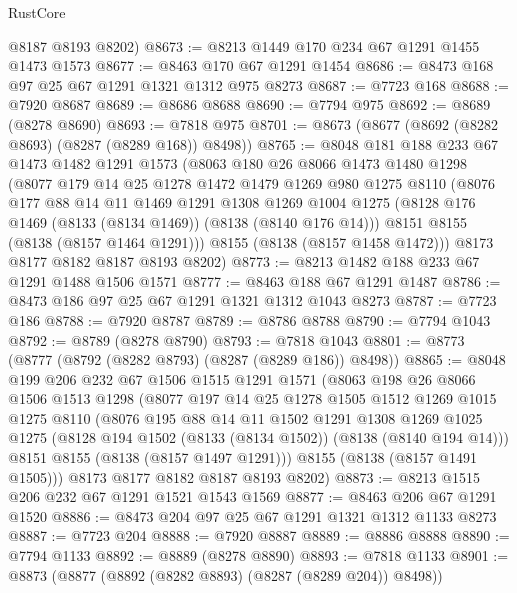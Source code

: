 \begin{lexlean}{RustCore}
\begin{coremodule}
      @8187
      @8193
      @8202)
@8673 := @8213 @1449 @170 @234 @67 @1291 @1455 @1473 @1573
@8677 := @8463 @170 @67 @1291 @1454
@8686 := @8473 @168 @97 @25 @67 @1291 @1321 @1312 @975 @8273
@8687 := @7723 @168
@8688 := @7920 @8687
@8689 := @8686 @8688
@8690 := @7794 @975
@8692 := @8689 (@8278 @8690)
@8693 := @7818 @975
@8701 := @8673 (@8677 (@8692 (@8282 @8693) (@8287 (@8289 @168)) @8498))
@8765 := @8048
    @181
    @188
    @233
    @67
    @1473
    @1482
    @1291
    @1573
    (@8063
      @180
      @26
      @8066
      @1473
      @1480
      @1298
      (@8077
        @179
        @14
        @25
        @1278
        @1472
        @1479
        @1269
        @980
        @1275
        @8110
        (@8076
          @177
          @88
          @14
          @11
          @1469
          @1291
          @1308
          @1269
          @1004
          @1275
          (@8128 @176 @1469 (@8133 (@8134 @1469)) (@8138 (@8140 @176 @14)))
          @8151
          @8155
          (@8138 (@8157 @1464 @1291)))
        @8155
        (@8138 (@8157 @1458 @1472)))
      @8173
      @8177
      @8182
      @8187
      @8193
      @8202)
@8773 := @8213 @1482 @188 @233 @67 @1291 @1488 @1506 @1571
@8777 := @8463 @188 @67 @1291 @1487
@8786 := @8473 @186 @97 @25 @67 @1291 @1321 @1312 @1043 @8273
@8787 := @7723 @186
@8788 := @7920 @8787
@8789 := @8786 @8788
@8790 := @7794 @1043
@8792 := @8789 (@8278 @8790)
@8793 := @7818 @1043
@8801 := @8773 (@8777 (@8792 (@8282 @8793) (@8287 (@8289 @186)) @8498))
@8865 := @8048
    @199
    @206
    @232
    @67
    @1506
    @1515
    @1291
    @1571
    (@8063
      @198
      @26
      @8066
      @1506
      @1513
      @1298
      (@8077
        @197
        @14
        @25
        @1278
        @1505
        @1512
        @1269
        @1015
        @1275
        @8110
        (@8076
          @195
          @88
          @14
          @11
          @1502
          @1291
          @1308
          @1269
          @1025
          @1275
          (@8128 @194 @1502 (@8133 (@8134 @1502)) (@8138 (@8140 @194 @14)))
          @8151
          @8155
          (@8138 (@8157 @1497 @1291)))
        @8155
        (@8138 (@8157 @1491 @1505)))
      @8173
      @8177
      @8182
      @8187
      @8193
      @8202)
@8873 := @8213 @1515 @206 @232 @67 @1291 @1521 @1543 @1569
@8877 := @8463 @206 @67 @1291 @1520
@8886 := @8473 @204 @97 @25 @67 @1291 @1321 @1312 @1133 @8273
@8887 := @7723 @204
@8888 := @7920 @8887
@8889 := @8886 @8888
@8890 := @7794 @1133
@8892 := @8889 (@8278 @8890)
@8893 := @7818 @1133
@8901 := @8873 (@8877 (@8892 (@8282 @8893) (@8287 (@8289 @204)) @8498))

\end{coremodule}
\end{lexlean}
